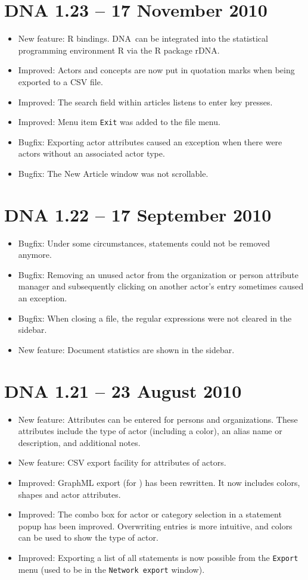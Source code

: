\documentclass[12pt,a4paper]{scrreprt}
\newcommand{\visone}
{\textsf%
 {\protect\raisebox{.5ex}{\color[rgb]{0.1,0.1,0.1}v}%
  \protect\raisebox{.1ex}{\color[rgb]{0.3,0.3,0.3}i}%
  \protect\raisebox{-.1ex}{\color[rgb]{0.1,0.1,0.1}s}%
  \protect\raisebox{.1ex}{\color[rgb]{0.3,0.3,0.3}o}%
  \protect\raisebox{-.1ex}{\color[rgb]{0.1,0.1,0.1}n}%
  \protect\raisebox{-.4ex}{\color[rgb]{0.3,0.3,0.3}e}%
 }%
}
\newcommand{\dnashort}{\textsc{DNA}}
\newcommand{\code}[1]{\texttt{#1}}
\begin{document}
\section*{DNA 1.23 -- 17 November 2010}
\begin{itemize}
 \item New feature: R bindings. \dnashort\ can be integrated into the statistical programming environment R via the R package rDNA.
 \item Improved: Actors and concepts are now put in quotation marks when being exported to a CSV file.
 \item Improved: The search field within articles listens to enter key presses.
 \item Improved: Menu item \code{Exit} was added to the file menu.
 \item Bugfix: Exporting actor attributes caused an exception when there were actors without an associated actor type.
 \item Bugfix: The New Article window was not scrollable.
\end{itemize}

\section*{DNA 1.22 -- 17 September 2010}
\begin{itemize}
 \item Bugfix: Under some circumstances, statements could not be removed anymore.
 \item Bugfix: Removing an unused actor from the organization or person attribute manager and subsequently clicking on another actor's entry sometimes caused an exception.
 \item Bugfix: When closing a file, the regular expressions were not cleared in the sidebar.
 \item New feature: Document statistics are shown in the sidebar.
\end{itemize}

\section*{DNA 1.21 -- 23 August 2010}
\begin{itemize}
 \item New feature: Attributes can be entered for persons and organizations. These attributes include the type of actor (including a color), an alias name or description, and additional notes.
 \item New feature: CSV export facility for attributes of actors.
 \item Improved: GraphML export (for \visone) has been rewritten. It now includes colors, shapes and actor attributes.
 \item Improved: The combo box for actor or category selection in a statement popup has been improved. Overwriting entries is more intuitive, and colors can be used to show the type of actor.
 \item Improved: Exporting a list of all statements is now possible from the \code{Export} menu (used to be in the \code{Network export} window).
\end{itemize}
\end{document}
